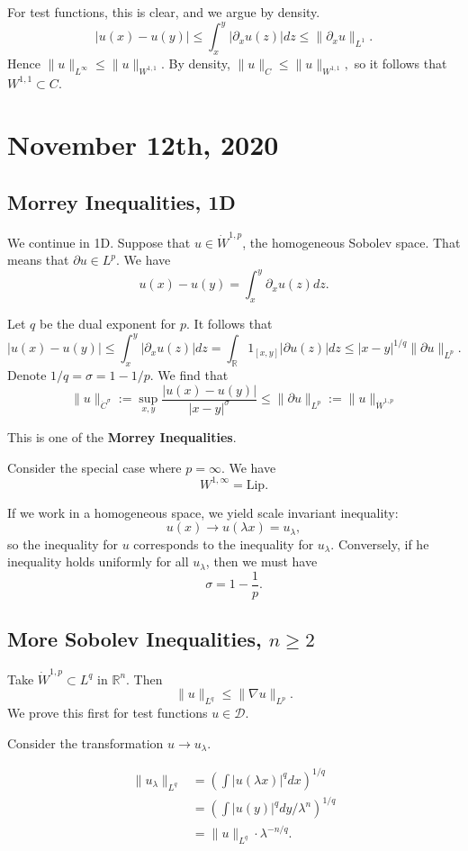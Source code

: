 \documentclass[11pt]{scrartcl}
\newcommand{\R}{\mathbb{R}}
\begin{document}
For test functions, this is clear, and we argue by density.  
$$|u(x) - u(y)| \le \int_x^y |\partial_x u(z)|dz \le \|\partial_x u\|_{L^1}.$$
Hence $\|u\|_{L^{\infty}} \le \|u\|_{W^{1, 1}}.$
By density, $\|u\|_C \le \|u\|_{W^{1, 1}},$
so it follows that $W^{1, 1} \subset C$.
\pagebreak
\section{November 12th, 2020}
\subsection{Morrey Inequalities, 1D}
We continue in 1D.  Suppose that $u \in \dot{W}^{1, p}$, the homogeneous Sobolev space.  That means that $\partial u \in L^p$.  
We have 
$$u(x) - u(y) = \int_{x}^y \partial_x u(z)dz.$$

Let $q$ be the dual exponent for $p$.  It follows that 
$$|u(x) - u(y)| \le \int_x^y |\partial_x u(z)|dz = \int_\R 1_{[x, y]}|\partial u(z)|dz \le |x-y|^{1/q}\|\partial u\|_{L^p} .$$
Denote $1/q = \sigma = 1 - 1/p$.  We find that 
$$\|u\|_{\dot{C}^{\sigma}} := \sup_{x, y} \frac{|u(x) - u(y)|}{|x-y|^{\sigma}} \le \|\partial u\|_{L^p}:= \|u\|_{\dot{W}^{1, p}}$$

This is one of the \textbf{Morrey Inequalities}.  
\begin{proposition} Consider the special case where $p = \infty$.  We have 
$$W^{1, \infty} = \text{Lip}.$$
\end{proposition}

If we work in a homogeneous space, we yield scale invariant inequality:
$$u(x) \to u(\lambda x) = u_\lambda,$$
so the inequality for $u$ corresponds to the inequality for $u_\lambda$.  Conversely, if he inequality holds uniformly for all $u_\lambda$, then we must have 
$$\sigma = 1 - \frac{1}{p}.$$
\subsection{More Sobolev Inequalities, $n \ge 2$}
Take $\dot{W}^{1, p} \subset L^q$ in $\R^n$.  Then 
$$\|u\|_{L^q}\le \|\nabla u \|_{L^p}.$$
We prove this first for test functions $u \in \mathcal D$.

Consider the transformation $u \to u_\lambda$.   

\begin{align*}
\| u_\lambda \|_{L^q} &= \left (\int |u(\lambda x)|^q dx \right )^{1/q} \\
&= \left (\int |u(y)|^q dy/\lambda^n\right )^{1/q} \\
&= \|u\|_{L^{q}} \cdot \lambda^{-n/q}.
\end{align*}
\end{document}
